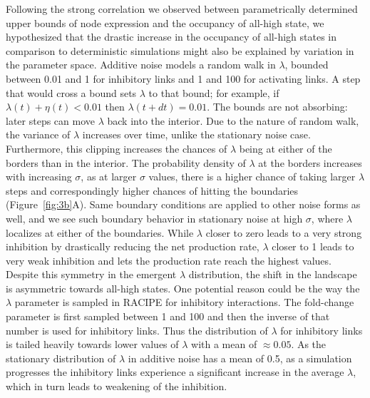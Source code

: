 \documentclass[11pt]{article}
\begin{document}
Following the strong correlation we observed between parametrically determined upper bounds of node expression and the occupancy of all-high state, we hypothesized that the drastic increase in the occupancy of all-high states in comparison to deterministic simulations might also be explained by variation in the parameter space. Additive noise models a random walk in $\lambda$, bounded between 0.01 and 1 for inhibitory links and 1 and 100 for activating links. A step that would cross a bound sets $\lambda$ to that bound; for example, if $\lambda(t) + \eta(t) < 0.01$ then $\lambda(t+dt) = 0.01$. The bounds are not absorbing: later steps can move $\lambda$ back into the interior. Due to the nature of random walk, the variance of $\lambda$ increases over time, unlike the stationary noise case. Furthermore, this clipping increases the chances of $\lambda$ being at either of the borders than in the interior. The probability density of $\lambda$ at the borders increases with increasing $\sigma$, as at larger $\sigma$ values, there is a higher chance of taking larger $\lambda$ steps and correspondingly higher chances of hitting the boundaries (Figure~\ref{fig:3b}A). Same boundary conditions are applied to other noise forms as well, and we see such boundary behavior in stationary noise at high $\sigma$, where $\lambda$ localizes at either of the boundaries. While $\lambda$ closer to zero leads to a very strong inhibition by drastically reducing the net production rate, $\lambda$ closer to 1 leads to very weak inhibition and lets the production rate reach the highest values. Despite this symmetry in the emergent $\lambda$ distribution, the shift in the landscape is asymmetric towards all-high states. One potential reason could be the way the $\lambda$ parameter is sampled in RACIPE for inhibitory interactions. The fold-change parameter is first sampled between 1 and 100 and then the inverse of that number is used for inhibitory links. Thus the distribution of $\lambda$ for inhibitory links is tailed heavily towards lower values of $\lambda$ with a mean of $\approx0.05$. As the stationary distribution of $\lambda$ in additive noise has a mean of 0.5, as a simulation progresses the inhibitory links experience a significant increase in the average $\lambda$, which in turn leads to weakening of the inhibition.
\end{document}
